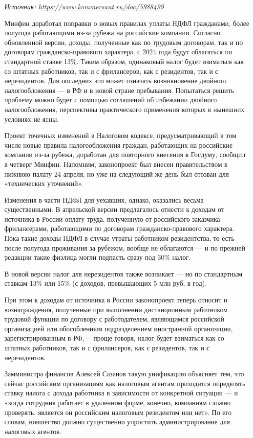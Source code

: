 {\it Источник: \url{https://www.kommersant.ru/doc/5988499}}

Минфин доработал поправки о новых правилах уплаты НДФЛ гражданами, более полугода работающими из-за рубежа на российские компании. Согласно обновленной версии, доходы, полученные как по трудовым договорам, так и по договорам гражданско-правового характера, с 2024 года будут облагаться по стандартной ставке 13\%. Таким образом, одинаковый налог будет взиматься как со штатных работников, так и с фрилансеров, как с резидентов, так и с нерезидентов. Для последних это может означать возникновение двойного налогообложения — в РФ и в новой стране пребывания. Попытаться решить проблему можно будет с помощью соглашений об избежании двойного налогообложения, перспективы практического применения которых в нынешних условиях не ясны.

Проект точечных изменений в Налоговом кодексе, предусматривающий в том числе новые правила налогообложения граждан, работающих на российские компании из-за рубежа, доработан для повторного внесения в Госдуму, сообщил в четверг Минфин. Напомним, законопроект был внесен правительством в нижнюю палату 24 апреля, но уже на следующий же день был отозван для «технических уточнений».

Изменения в части НДФЛ для уехавших, однако, оказались весьма существенными. В апрельской версии предлагалось отнести к доходам от источника в России оплату труда, полученную от российского заказчика фрилансерами, работающими по договорам гражданско-правового характера. Пока такие доходы НДФЛ в случае утраты работником резидентства, то есть после полугода проживания за рубежом, вообще не облагаются — и по прежней редакции такие физлица могли подпасть сразу под 30\% налог.

\begin{fancyquotes}
    В новой версии налог для нерезидентов также возникает — но по стандартным ставкам 13\% или 15\% (с доходов, превышающих 5 млн руб. в год).
\end{fancyquotes}

При этом к доходам от источника в России законопроект теперь относит и вознаграждения, полученные при выполнении дистанционным работником трудовой функции по договору с работодателем, являющимся российской организацией или обособленным подразделением иностранной организации, зарегистрированным в РФ,— проще говоря, налог будет взиматься как со штатных работников, так и с фрилансеров, как с резидентов, так и с нерезидентов.

Замминистра финансов Алексей Сазанов такую унификацию объясняет тем, что сейчас российским организациям как налоговым агентам приходится определять ставку налога с дохода работника в зависимости от конкретной ситуации — и «когда сотрудник работает в удаленном форме, конечно, компаниям сложно проверять, является он российским налоговым резидентом или нет». По его словам, новшество должно существенно упростить администрирование для налоговых агентов.


